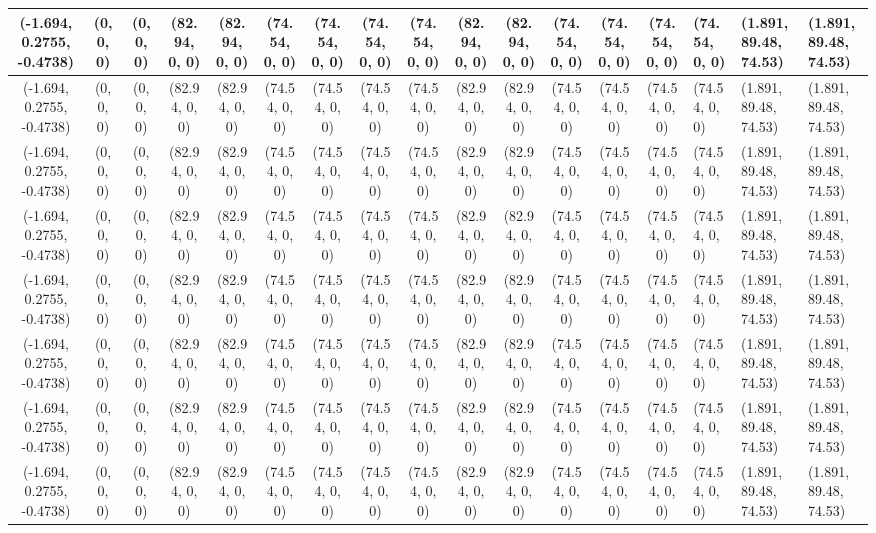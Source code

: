 \begin{tabular}{| c | c | c | c | c | c | c | c | c | c | c | c | c | c |}
	(-1.694, 0.2755, -0.4738) & (0, 0, 0) & (0, 0, 0) & (82.94, 0, 0) & (82.94, 0, 0) & (74.54, 0, 0) & (74.54, 0, 0) & (74.54, 0, 0) & (74.54, 0, 0) & (82.94, 0, 0) & (82.94, 0, 0) & (74.54, 0, 0) & (74.54, 0, 0) & (74.54, 0, 0) & (74.54, 0, 0) & (1.891, 89.48, 74.53) & (1.891, 89.48, 74.53) \\ \hline
	(-1.694, 0.2755, -0.4738) & (0, 0, 0) & (0, 0, 0) & (82.94, 0, 0) & (82.94, 0, 0) & (74.54, 0, 0) & (74.54, 0, 0) & (74.54, 0, 0) & (74.54, 0, 0) & (82.94, 0, 0) & (82.94, 0, 0) & (74.54, 0, 0) & (74.54, 0, 0) & (74.54, 0, 0) & (74.54, 0, 0) & (1.891, 89.48, 74.53) & (1.891, 89.48, 74.53) \\ \hline
	(-1.694, 0.2755, -0.4738) & (0, 0, 0) & (0, 0, 0) & (82.94, 0, 0) & (82.94, 0, 0) & (74.54, 0, 0) & (74.54, 0, 0) & (74.54, 0, 0) & (74.54, 0, 0) & (82.94, 0, 0) & (82.94, 0, 0) & (74.54, 0, 0) & (74.54, 0, 0) & (74.54, 0, 0) & (74.54, 0, 0) & (1.891, 89.48, 74.53) & (1.891, 89.48, 74.53) \\ \hline
	(-1.694, 0.2755, -0.4738) & (0, 0, 0) & (0, 0, 0) & (82.94, 0, 0) & (82.94, 0, 0) & (74.54, 0, 0) & (74.54, 0, 0) & (74.54, 0, 0) & (74.54, 0, 0) & (82.94, 0, 0) & (82.94, 0, 0) & (74.54, 0, 0) & (74.54, 0, 0) & (74.54, 0, 0) & (74.54, 0, 0) & (1.891, 89.48, 74.53) & (1.891, 89.48, 74.53) \\ \hline
	(-1.694, 0.2755, -0.4738) & (0, 0, 0) & (0, 0, 0) & (82.94, 0, 0) & (82.94, 0, 0) & (74.54, 0, 0) & (74.54, 0, 0) & (74.54, 0, 0) & (74.54, 0, 0) & (82.94, 0, 0) & (82.94, 0, 0) & (74.54, 0, 0) & (74.54, 0, 0) & (74.54, 0, 0) & (74.54, 0, 0) & (1.891, 89.48, 74.53) & (1.891, 89.48, 74.53) \\ \hline
	(-1.694, 0.2755, -0.4738) & (0, 0, 0) & (0, 0, 0) & (82.94, 0, 0) & (82.94, 0, 0) & (74.54, 0, 0) & (74.54, 0, 0) & (74.54, 0, 0) & (74.54, 0, 0) & (82.94, 0, 0) & (82.94, 0, 0) & (74.54, 0, 0) & (74.54, 0, 0) & (74.54, 0, 0) & (74.54, 0, 0) & (1.891, 89.48, 74.53) & (1.891, 89.48, 74.53) \\ \hline
	(-1.694, 0.2755, -0.4738) & (0, 0, 0) & (0, 0, 0) & (82.94, 0, 0) & (82.94, 0, 0) & (74.54, 0, 0) & (74.54, 0, 0) & (74.54, 0, 0) & (74.54, 0, 0) & (82.94, 0, 0) & (82.94, 0, 0) & (74.54, 0, 0) & (74.54, 0, 0) & (74.54, 0, 0) & (74.54, 0, 0) & (1.891, 89.48, 74.53) & (1.891, 89.48, 74.53) \\ \hline
	(-1.694, 0.2755, -0.4738) & (0, 0, 0) & (0, 0, 0) & (82.94, 0, 0) & (82.94, 0, 0) & (74.54, 0, 0) & (74.54, 0, 0) & (74.54, 0, 0) & (74.54, 0, 0) & (82.94, 0, 0) & (82.94, 0, 0) & (74.54, 0, 0) & (74.54, 0, 0) & (74.54, 0, 0) & (74.54, 0, 0) & (1.891, 89.48, 74.53) & (1.891, 89.48, 74.53)
\end{tabular}